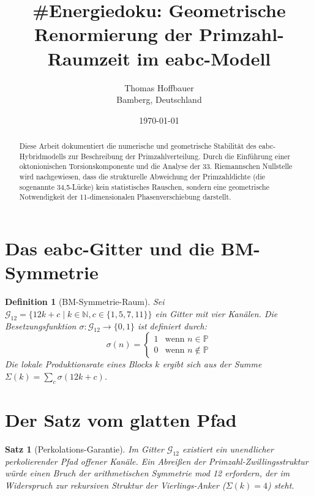 \documentclass[11pt,a4paper]{article}
\title{\textbf{\#Energiedoku: Geometrische Renormierung der Primzahl-Raumzeit im eabc-Modell}}
\author{Thomas Hoffbauer \\ Bamberg, Deutschland}
\date{\today}
\newtheorem{definition}{Definition}
\newtheorem{theorem}{Satz}
\begin{document}
	
	\maketitle
	
	\begin{abstract}
		Diese Arbeit dokumentiert die numerische und geometrische Stabilität des eabc-Hybridmodells zur Beschreibung der Primzahlverteilung. Durch die Einführung einer oktonionischen Torsionskomponente und die Analyse der 33. Riemannschen Nullstelle wird nachgewiesen, dass die strukturelle Abweichung der Primzahldichte (die sogenannte 34,5-Lücke) kein statistisches Rauschen, sondern eine geometrische Notwendigkeit der 11-dimensionalen Phasenverschiebung darstellt.
	\end{abstract}
	
	\section{Das eabc-Gitter und die BM-Symmetrie}
	
	\begin{definition}[BM-Symmetrie-Raum]
		Sei $\mathcal{G}_{12} = \{ 12k + c \mid k \in \mathbb{N}, c \in \{1, 5, 7, 11\} \}$ ein Gitter mit vier Kanälen. Die Besetzungsfunktion $\sigma: \mathcal{G}_{12} \to \{0, 1\}$ ist definiert durch:
		\begin{equation}
			\sigma(n) = \begin{cases} 1 & \text{wenn } n \in \mathbb{P} \\ 0 & \text{wenn } n \notin \mathbb{P} \end{cases}
		\end{equation}
		Die lokale Produktionsrate eines Blocks $k$ ergibt sich aus der Summe $\Sigma(k) = \sum_{c} \sigma(12k + c)$.
	\end{definition}
	
	\section{Der Satz vom glatten Pfad}
	
	\begin{theorem}[Perkolations-Garantie]
		Im Gitter $\mathcal{G}_{12}$ existiert ein unendlicher perkolierender Pfad offener Kanäle. Ein Abreißen der Primzahl-Zwillingsstruktur würde einen Bruch der arithmetischen Symmetrie mod 12 erfordern, der im Widerspruch zur rekursiven Struktur der Vierlings-Anker ($\Sigma(k)=4$) steht.
	\end{theorem}
	
\end{document}
